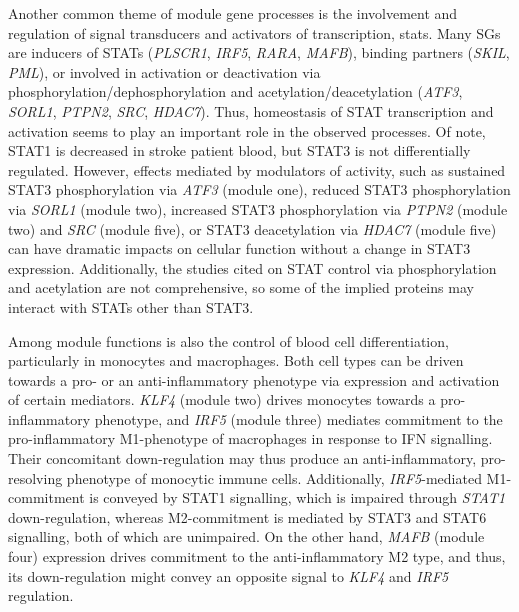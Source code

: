 Another common theme of module gene processes is the involvement and regulation of signal transducers and activators of transcription, \acp{stat}. Many SGs are inducers of STATs (\emph{PLSCR1}, \emph{IRF5}, \emph{RARA}, \emph{MAFB}), binding partners (\emph{SKIL}, \emph{PML}), or involved in activation or deactivation via phosphorylation/dephosphorylation and acetylation/deacetylation (\emph{ATF3}, \emph{SORL1}, \emph{PTPN2}, \emph{SRC}, \emph{HDAC7}). Thus, homeostasis of STAT transcription and activation seems to play an important role in the observed processes. Of note, STAT1 is decreased in stroke patient blood, but STAT3 is not differentially regulated. However, effects mediated by modulators of activity, such as sustained STAT3 phosphorylation via \emph{ATF3} (module one), reduced STAT3 phosphorylation via \emph{SORL1} (module two), increased STAT3 phosphorylation via \emph{PTPN2} (module two) and \emph{SRC} (module five), or STAT3 deacetylation via \emph{HDAC7} (module five) can have dramatic impacts on cellular function without a change in STAT3 expression. Additionally, the studies cited on STAT control via phosphorylation and acetylation are not comprehensive, so some of the implied proteins may interact with STATs other than STAT3.

Among module functions is also the control of blood cell differentiation, particularly in monocytes and macrophages. Both cell types can be driven towards a pro- or an anti-inflammatory phenotype via expression and activation of certain mediators. \emph{KLF4} (module two) drives monocytes towards a pro-inflammatory phenotype, and \emph{IRF5} (module three) mediates commitment to the pro-inflammatory M1-phenotype of macrophages in response to IFN signalling. Their concomitant down-regulation may thus produce an anti-inflammatory, pro-resolving phenotype of monocytic immune cells. Additionally, \emph{IRF5}-mediated M1-commitment is conveyed by STAT1 signalling, which is impaired through \emph{STAT1} down-regulation, whereas M2-commitment is mediated by STAT3 and STAT6 signalling, both of which are unimpaired. On the other hand, \emph{MAFB} (module four) expression drives commitment to the anti-inflammatory M2 type, and thus, its down-regulation might convey an opposite signal to \emph{KLF4} and \emph{IRF5} regulation. 


